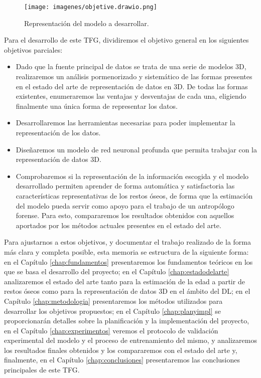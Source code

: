 \begin{figure}[ht!]
    \centering
    \texttt{[image: imagenes/objetive.drawio.png]}
    \caption{Representación del modelo a desarrollar.}
    \label{fig:modelo}
\end{figure}

Para el desarrollo de este TFG, dividiremos el objetivo general en los siguientes objetivos parciales:
\begin{itemize}
    \item Dado que la fuente principal de datos se trata de una serie de modelos 3D, realizaremos un análisis pormenorizado y sistemático de las formas presentes en el estado del arte de representación de datos en 3D. De todas las formas existentes, enumeraremos las ventajas y desventajas de cada una, eligiendo finalmente una única forma de representar los datos.
    \item Desarrollaremos las herramientas necesarias para poder implementar la representación de los datos.
    \item Diseñaremos un modelo de red neuronal profunda que permita trabajar con la representación de datos 3D. 
    \item Comprobaremos si la representación de la información escogida y el modelo desarrollado permiten aprender de forma automática y satisfactoria las características representativas de los restos óseos, de forma que la estimación del modelo pueda servir como apoyo para el trabajo de un antropólogo forense. Para esto, compararemos los resultados obtenidos con aquellos aportados por los métodos actuales presentes en el estado del arte.
\end{itemize}

Para ajustarnos a estos objetivos, y documentar el trabajo realizado de la forma más clara y completa posible, esta memoria se estructura de la siguiente forma: en el Capítulo \ref{chap:fundamentos} presentaremos los fundamentos teóricos en los que se basa el desarrollo del proyecto; en el Capítulo \ref{chap:estadodelarte} analizaremos el estado del arte tanto para la estimación de la edad a partir de restos óseos como para la representación de datos 3D en el ámbito del DL; en el Capítulo \ref{chap:metodologia} presentaremos los métodos utilizados para desarrollar los objetivos propuestos; en el Capítulo \ref{chap:planyimpl} se proporcionarán detalles sobre la planificación y la implementación del proyecto, en el Capítulo \ref{chap:experimentos} veremos el protocolo de validación experimental del modelo y el proceso de entrenamiento del mismo, y analizaremos los resultados finales obtenidos y los compararemos con el estado del arte y, finalmente, en el Capítulo \ref{chap:conclusiones} presentaremos las conclusiones principales de este TFG.